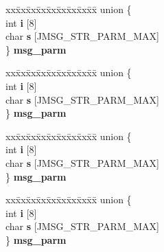 \begin{DoxyCompactItemize}
\begin{tabbing}
\end{tabbing}\item 
\mbox{\label{structjpeg__error__mgr_a32b6fe1f2844016976f1612c765c36cd}} 
\begin{tabbing}
xx\=xx\=xx\=xx\=xx\=xx\=xx\=xx\=xx\=\kill
union \{\\
\>int {\bfseries i} \mbox{[}8\mbox{]}\\
\>char {\bfseries s} \mbox{[}JMSG\_STR\_PARM\_MAX\mbox{]}\\
\} {\bfseries msg\_parm}\\

\end{tabbing}\item 
\mbox{\label{structjpeg__error__mgr_a5afb38aadb338b91f449bc215d0667b7}} 
\begin{tabbing}
xx\=xx\=xx\=xx\=xx\=xx\=xx\=xx\=xx\=\kill
union \{\\
\>int {\bfseries i} \mbox{[}8\mbox{]}\\
\>char {\bfseries s} \mbox{[}JMSG\_STR\_PARM\_MAX\mbox{]}\\
\} {\bfseries msg\_parm}\\

\end{tabbing}\item 
\mbox{\label{structjpeg__error__mgr_a12dcfe2000dcb522a471677a5ff12e32}} 
\begin{tabbing}
xx\=xx\=xx\=xx\=xx\=xx\=xx\=xx\=xx\=\kill
union \{\\
\>int {\bfseries i} \mbox{[}8\mbox{]}\\
\>char {\bfseries s} \mbox{[}JMSG\_STR\_PARM\_MAX\mbox{]}\\
\} {\bfseries msg\_parm}\\

\end{tabbing}\item 
\mbox{\label{structjpeg__error__mgr_ac2f698a514d87f893ad2a7ea1046adde}} 
\begin{tabbing}
xx\=xx\=xx\=xx\=xx\=xx\=xx\=xx\=xx\=\kill
union \{\\
\>int {\bfseries i} \mbox{[}8\mbox{]}\\
\>char {\bfseries s} \mbox{[}JMSG\_STR\_PARM\_MAX\mbox{]}\\
\} {\bfseries msg\_parm}\\


\end{tabbing}
\end{DoxyCompactItemize}
